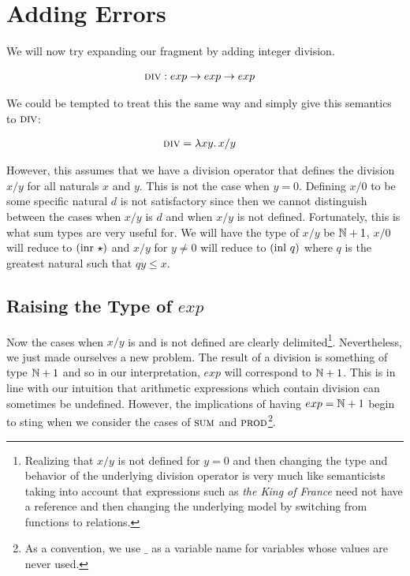 \section{Adding Errors}

We will now try expanding our fragment by adding integer division.

\begin{align*}
  \textsc{div} &: exp \to exp \to exp
\end{align*}

We could be tempted to treat this the same way and simply give this
semantics to $\textsc{div}$:

\begin{align*}
  \textsc{div} &= \lambda x y.\, x / y
\end{align*}

However, this assumes that we have a division operator that defines the
division $x/y$ for all naturals $x$ and $y$. This is not the case when $y =
0$. Defining $x/0$ to be some specific natural $d$ is not satisfactory
since then we cannot distinguish between the cases when $x/y$ is $d$ and
when $x/y$ is not defined. Fortunately, this is what sum types are very
useful for. We will have the type of $x/y$ be $\mathbb{N} + 1$, $x/0$ will reduce
to $(\operatorname{inr}\,\star)$ and $x/y$ for $y \neq 0$ will reduce to
$(\operatorname{inl}\,q)$ where $q$ is the greatest natural such that $q y \le
x$.

\subsection{Raising the Type of $exp$}
\label{ssec:raising-the-type-of-exp}

Now the cases when $x/y$ is and is not defined are clearly
delimited\footnote{Realizing that $x/y$ is not defined for $y = 0$ and then
  changing the type and behavior of the underlying division operator is
  very much like semanticists taking into account that expressions such as
  \emph{the King of France} need not have a reference and then changing the
  underlying model by switching from functions to
  relations.}. Nevertheless, we just made ourselves a new problem. The
result of a division is something of type $\mathbb{N} + 1$ and so in our
interpretation, $exp$ will correspond to $\mathbb{N} + 1$. This is in line with
our intuition that arithmetic expressions which contain division can
sometimes be undefined. However, the implications of having $exp = \mathbb{N} + 1$
begin to sting when we consider the cases of $\textsc{sum}$ and
$\textsc{prod}$\footnote{As a convention, we use $\_$ as a variable name for
  variables whose values are never used.}.

